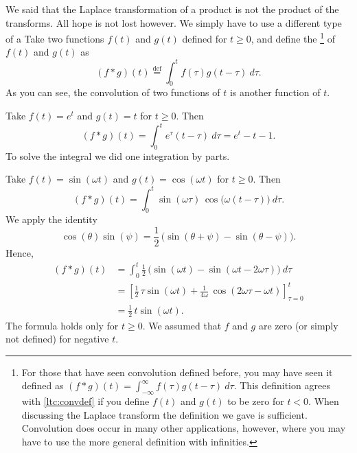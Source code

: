 \documentclass[12pt]{book}
\begin{document}
We said that the Laplace transformation of a product is not the product
of the transforms.  All hope is not lost however.  We simply have to use
a different type of a 
Take
two functions $f(t)$ and $g(t)$ defined for $t \geq 0$,
and define the \emph{}%
\footnote{%
For those that have seen convolution defined before, you may have
seen it defined as
$(f * g)(t) =
\int_{-\infty}^\infty f(\tau) g(t-\tau) ~ d\tau$.  This definition
agrees with \eqref{ltc:convdef} if you define $f(t)$ and $g(t)$
to be zero for $t < 0$.
When discussing the Laplace transform the definition we gave is
sufficient.  Convolution does occur in many other applications, however,
where you may have to use the more general definition with infinities.
}
of $f(t)$ and $g(t)$ as
\begin{equation} \label{ltc:convdef}
\boxed{~~
(f * g)(t) \overset{\text{def}}{=}
\int_0^t f(\tau) g(t-\tau) ~ d\tau .
~~}
\end{equation}
As you can see, the convolution of two functions of $t$ is another function of $t$.


\begin{example}
Take $f(t) = e^t$ and $g(t) = t$ for $t \geq 0$.  Then 
\begin{equation*}
(f*g)(t)
=
\int_0^t e^\tau (t-\tau) ~ d\tau
=
e^t - t - 1 .
\end{equation*}
To solve the integral we
did one integration by parts.
\end{example}

\begin{example} \label{ltc:convsincosex}
Take $f(t) = \sin (\omega t)$ and $g(t) = \cos (\omega t)$ for $t \geq 0$.
Then 
\begin{equation*}
(f*g)(t)
=
\int_0^t  \sin ( \omega \tau ) \,
\cos \bigl( \omega (t-\tau) \bigr) ~ d\tau .
\end{equation*}
We apply the identity
\begin{equation*}
\cos (\theta) \sin (\psi) =
\frac{1}{2} \, \bigl( \sin (\theta + \psi) - \sin (\theta - \psi) \bigr) .
\end{equation*}
Hence,
\begin{equation*}
\begin{split}
(f*g)(t)
& =
\int_0^t
\frac{1}{2} \, \bigl( \sin (\omega t) - \sin (\omega t - 2 \omega \tau
) \bigr) ~ d\tau
\\
& =
\left[ \frac{1}{2} \, \tau  \sin (\omega t) + \frac{1}{4\omega} \, \cos (2 \omega \tau -
\omega t) \right]_{\tau=0}^t
\\
& = \frac{1}{2} \, t \sin (\omega t) .
\end{split}
\end{equation*}
The formula holds only for $t \geq 0$.  We assumed that $f$
and $g$ are zero (or simply not defined) for negative $t$.
\end{example}
\end{document}
